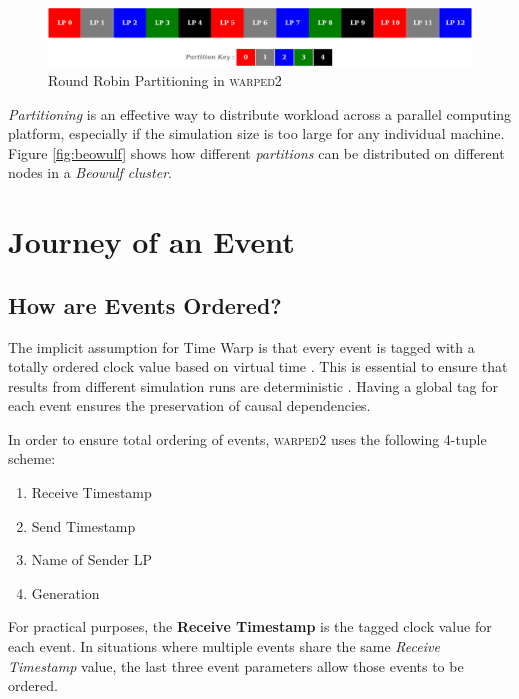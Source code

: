 \documentclass[11pt]{book}
\begin{document}
\begin{figure}
    \centering
    \includegraphics[width=1\textwidth]{figures/round_robin_partitions.pdf}
    \caption{Round Robin Partitioning in \textsc{warped2}}\label{fig:round_robin}
\end{figure}

\emph{Partitioning} is an effective way to distribute workload across a parallel computing platform,
especially if the simulation size is too large for any individual machine.  Figure \ref{fig:beowulf} shows how
different \emph{partitions} can be distributed on different nodes in a \emph{Beowulf cluster}.

\section{Journey of an Event}\label{sec:journey_of_event}

\subsection{How are Events Ordered?}\label{subsec:event_order}

The implicit assumption for Time Warp is that every event is tagged with a totally ordered clock value based
on virtual time \cite{jefferson-85}.  This is essential to ensure that results from different simulation runs
are deterministic \cite{ronngren-99}.  Having a global tag for each event ensures the preservation of causal
dependencies.

\noindent
In order to ensure total ordering of events, \textsc{warped2} uses the following 4-tuple scheme:

\begin{enumerate}
    \item Receive Timestamp
    \item Send Timestamp
    \item Name of Sender LP
    \item Generation
\end{enumerate}

\noindent
For practical purposes, the \textbf{Receive Timestamp} is the tagged clock value for each event.  In
situations where multiple events share the same \emph{Receive Timestamp} value, the last three event
parameters allow those events to be ordered.
\end{document}
